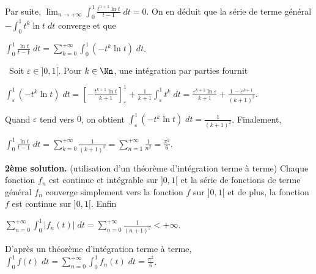 {{Par suite, $\lim_{n \rightarrow +\infty}\int_{0}^{1}\frac{t^{n+1}\ln t}{t-1}\;dt=0$. On en déduit que la série de terme général $-\int_{0}^{1}t^k\ln t\;dt$ converge et que

\begin{center}
$\int_{0}^{1}\frac{\ln t}{t-1}\;dt=\sum_{k=0}^{+\infty}\int_{0}^{1}(-t^k\ln t)\;dt$.
\end{center}

\textbullet~Soit $\varepsilon\in]0,1[$. Pour $k\in\Nn$, une intégration par parties fournit

\begin{center}
$\int_{\varepsilon}^{1}(-t^k\ln t)\;dt=\left[-\frac{t^{k+1}\ln t}{k+1}\right]_\varepsilon^{1}+\frac{1}{k+1}\int_{\varepsilon}^{1}t^k\;dt=\frac{\varepsilon^{k+1}\ln \varepsilon}{k+1}+\frac{1-\varepsilon^{k+1}}{(k+1)^2}$.
\end{center}

Quand $\varepsilon$ tend vers $0$, on obtient $\int_{\varepsilon}^{1}(-t^k\ln t)\;dt=\frac{1}{(k+1)^2}$. Finalement,

\begin{center}
$\int_{0}^{1}\frac{\ln t}{t-1}\;dt=\sum_{k=0}^{+\infty}\frac{1}{(k+1)^2}=\sum_{n=1}^{+\infty}\frac{1}{n^2}=\frac{\pi^2}{6}$.
\end{center}

\begin{center}
\end{center}

\textbf{2ème solution.} (utilisation d'un théorème d'intégration terme à terme) Chaque fonction $f_n$ est continue et intégrable sur $]0,1[$ et la série de fonctions de terme général $f_n$ converge simplement vers la fonction $f$ sur $]0,1[$ et de plus, la fonction $f$ est continue sur $]0,1[$. Enfin

\begin{center}
$\sum_{n=0}^{+\infty}\int_{0}^{1}|f_n(t)|\;dt=\sum_{n=0}^{+\infty}\frac{1}{(n+1)^2}<+\infty$.
\end{center}

D'après un théorème d'intégration terme à terme, $\int_{0}^{1}f(t)\;dt=\sum_{n=0}^{+\infty}\int_{0}^{1}f_n(t)\;dt=\frac{\pi^2}{6}$.
}
}
